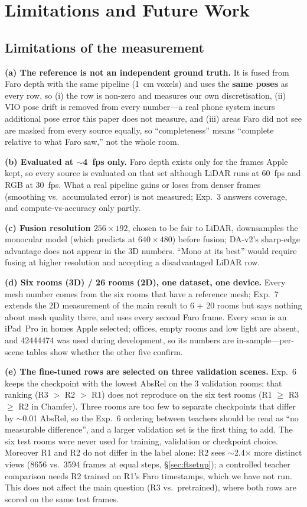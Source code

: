 \section{Limitations and Future Work}\label{sec:limitations}

\subsection{Limitations of the measurement}
\textbf{(a) The reference is not an independent ground truth.} It is fused from Faro depth with the same pipeline
(\SI{1}{cm} voxels) and uses the \textbf{same poses} as every row, so (i) the  row is non-zero and measures our
own discretisation, (ii) VIO pose drift is removed from every number---a real phone system incurs additional pose
error this paper does not measure, and (iii) areas Faro did not see are masked from every source equally, so
``completeness'' means ``complete relative to what Faro saw,'' not the whole room.

\textbf{(b) Evaluated at $\sim$4~fps only.} Faro depth exists only for the frames Apple kept, so every source is
evaluated on that set although LiDAR runs at 60~fps and RGB at 30~fps. What a real pipeline gains or loses from denser
frames (smoothing vs.\ accumulated error) is not measured; Exp.~3 answers coverage, and compute-vs-accuracy only partly.

\textbf{(c) Fusion resolution $256\times192$}, chosen to be fair to LiDAR, downsamples the monocular model (which predicts
at $640\times480$) before fusion; DA-v2's sharp-edge advantage does not appear in the 3D numbers. ``Mono at its best''
would require fusing at higher resolution and accepting a disadvantaged LiDAR row.

\textbf{(d) Six rooms (3D) / 26 rooms (2D), one dataset, one device.} Every mesh number comes from the six rooms that
have a reference mesh; Exp.~7 extends the 2D measurement of the main result to 6 $+$ 20 rooms but says nothing about
mesh quality there, and uses every second Faro frame. Every scan is an iPad~Pro in homes Apple selected; offices, empty
rooms and low light are absent, and 42444474 was used during development, so its numbers are in-sample---per-scene
tables show whether the other five confirm.

\textbf{(e) The fine-tuned rows are selected on three validation scenes.} Exp.~6 keeps the checkpoint with the lowest
AbsRel on the 3 validation rooms; that ranking (R3 $>$ R2 $>$ R1) does not reproduce on the six test rooms
(R1 $\geq$ R3 $\geq$ R2 in Chamfer). Three rooms are too few to separate checkpoints that differ by $\sim$0.01 AbsRel,
so the Exp.~6 ordering between teachers should be read as ``no measurable difference'', and a larger validation set is
the first thing to add. The six test rooms were never used for training, validation or checkpoint choice. Moreover R1
and R2 do not differ in the label alone: R2 sees $\sim$2.4$\times$ more distinct views (\num{8656} vs.\ \num{3594}
frames at equal steps, \S\ref{sec:ftsetup}); a controlled teacher comparison needs R2 trained on R1's Faro timestamps,
which we have not run. This does not affect the main question (R3 vs.\ pretrained), where both rows are scored on the
same test frames.


